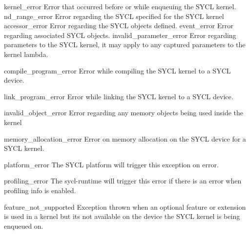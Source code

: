 \completeTable
\addRow
{kernel_error}
{Error that occurred before or while enqueuing the SYCL kernel.}
\addRow
{nd_range_error}
{Error regarding the SYCL  specified for the SYCL kernel}
\addRow
{accessor_error}
{Error regarding the SYCL  objects defined.}
\addRow
{event_error}
{Error regarding associated SYCL  objects.}
\addRow
{invalid_parameter_error}
{Error regarding parameters to the SYCL kernel, it may apply to any captured parameters
to the kernel lambda.}
\completeTable

\addRow
{compile_program_error}
{Error while compiling the SYCL kernel to a SYCL device.}

\addRow
{link_program_error}
{Error while linking the SYCL kernel to a SYCL device.}

\addRow
{invalid_object_error}
{Error regarding any memory objects being used inside the kernel}

\addRow
{memory_allocation_error}
{Error on memory allocation on the SYCL device for a SYCL kernel.}

\addRow
{platform_error}
{The SYCL platform will trigger this exception on error.}

\addRow
{profiling_error}
{The \gls{sycl-runtime} will trigger this error if there is an error when profiling info
is enabled.}

\addRow
{feature_not_supported}
{Exception thrown when an optional feature or extension is used in a kernel
but its not available on the device the SYCL kernel is being enqueued on.}
\completeTable

